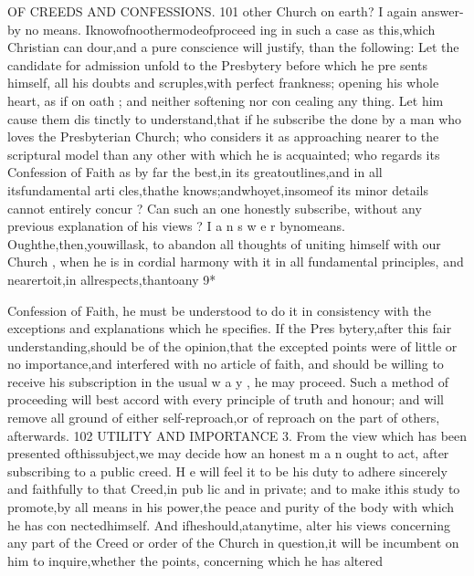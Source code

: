 \documentclass[
]{book}
\begin{document}
OF CREEDS AND CONFESSIONS. 101
other Church on earth? I again answer- by no means. Iknowofnoothermodeofproceed
ing in such a case as this,which Christian can dour,and a pure conscience will justify, than the following: Let the candidate for admission
unfold to the Presbytery before which he pre sents himself, all his doubts and scruples,with perfect frankness; opening his whole heart, as if on oath ; and neither softening nor con cealing any thing. Let him cause them dis tinctly to understand,that if he subscribe the
done by a man who loves the Presbyterian Church; who considers it as approaching
nearer to the scriptural model than any other with which he is acquainted; who regards its
Confession of Faith as by far the best,in its greatoutlines,and in all itsfundamental arti cles,thathe knows;andwhoyet,insomeof its minor details cannot entirely concur ? Can such an one honestly subscribe, without any previous explanation of his views ? I a n s w e r bynomeans. Oughthe,then,youwillask,
to abandon all thoughts of uniting himself with our Church , when he is in cordial harmony with it in all fundamental principles, and
nearertoit,in allrespects,thantoany
9*

Confession of Faith, he must be understood to do it in consistency with the exceptions and explanations which he specifies. If the Pres bytery,after this fair understanding,should be of the opinion,that the excepted points were of little or no importance,and interfered with no article of faith, and should be willing to receive his subscription in the usual w a y , he
may proceed. Such a method of proceeding will best accord with every principle of truth and honour; and will remove all ground of either self-reproach,or of reproach on the part
of others, afterwards.
102 UTILITY AND IMPORTANCE
3. From the view which has been presented
ofthissubject,we may decide how an honest m a n ought to act, after subscribing to a public creed. H e will feel it to be his duty to adhere
sincerely and faithfully to that Creed,in pub
lic and in private; and to make ithis study to
promote,by all means in his power,the peace
and purity of the body with which he has con nectedhimself. And ifheshould,atanytime,
alter his views concerning any part of the Creed or order of the Church in question,it
will be incumbent on him to inquire,whether the points, concerning which he has altered
\end{document}
